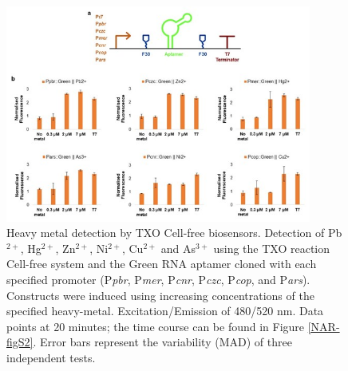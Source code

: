 \begin{figure}[t]
\begin{center}
\hspace*{0cm}
\includegraphics[width=380px]{chapter2/chapter/figs/Imagen3.jpg}
\end{center}
\caption{Heavy metal detection by TXO Cell-free biosensors. Detection of Pb$^{2+}$, Hg$^{2+}$, Zn$^{2+}$, Ni$^{2+}$, Cu$^{2+}$ and As$^{3+}$
using the TXO reaction Cell-free system and the Green RNA aptamer cloned with each specified promoter (P\textit{pbr}, P\textit{mer}, P\textit{cnr}, P\textit{czc}, P\textit{cop}, and P\textit{ars}). Constructs were induced using increasing concentrations of the specified heavy-metal. Excitation/Emission of 480/520 nm. Data points at 20 minutes; the time course can be found in Figure \ref{NAR-figS2}. Error bars represent the variability (MAD) of three independent tests.}
\label{NAR-fig3}
\end{figure}


